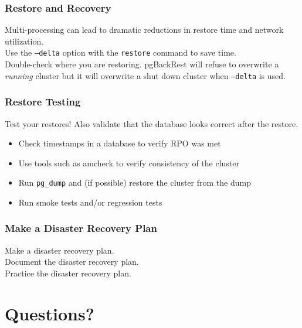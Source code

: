 \begin{frame}
    \frametitle{Restore and Recovery}

    Multi-processing can lead to dramatic reductions in restore time and network utilization.
    \\\vspace{1em}
    Use the \texttt{--delta} option with the \texttt{restore} command to save time.
    \\\vspace{1em}
    Double-check where you are restoring. pgBackRest will refuse to overwrite a \textit{running} cluster but it will overwrite a shut down cluster when \texttt{--delta} is used.
\end{frame}

\begin{frame}
    \frametitle{Restore Testing}

    Test your restores! Also validate that the database looks correct after the restore.

    \begin{itemize}
        \item Check timestamps in a database to verify RPO was met
        \item Use tools such as amcheck to verify consistency of the cluster
        \item Run \texttt{pg\_dump} and (if possible) restore the cluster from the dump
        \item Run smoke tests and/or regression tests
    \end{itemize}
\end{frame}

\begin{frame}
    \frametitle{Make a Disaster Recovery Plan}

    \Large Make a disaster recovery plan.
    \\\vspace{1em}
    \Large Document the disaster recovery plan.
    \\\vspace{1em}
    \Large Practice the disaster recovery plan.
\end{frame}

\section{Questions?}

